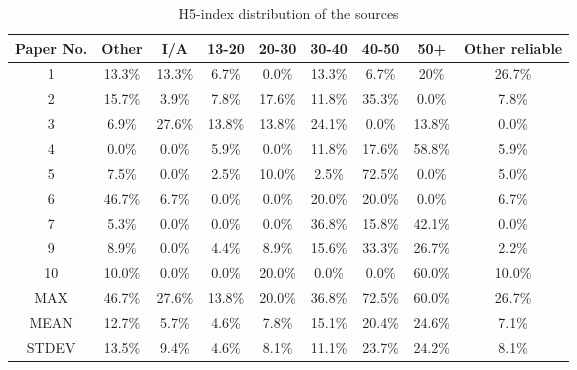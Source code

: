 \begin{table}[htb]
    \caption{H5-index distribution of the sources}
    \centering
      \begin{tabular}{ccccccccc}
        \toprule[1.5pt]
        \textbf{Paper No.} &	\textbf{Other}&	\textbf{I/A}&	\textbf{13-20}&	\textbf{20-30}&	\textbf{30-40} & \textbf{40-50} &\textbf{50+}	&\textbf{Other reliable} \\
        \midrule[1pt]
        1	&13.3\%	&13.3\%	&6.7\%&	0.0\%	&13.3\%	&6.7\%	&20\%	&26.7\% \\
        2	&15.7\%	&3.9\%	&7.8\%	&17.6\%	&11.8\%	&35.3\%	&0.0\%	&7.8\% \\
        3	&6.9\%	&27.6\%	&13.8\%	&13.8\%	&24.1\%	&0.0\%	&13.8\%	&0.0\% \\
        4	&0.0\%	&0.0\%	&5.9\%	&0.0\%	&11.8\%	&17.6\%	&58.8\%	&5.9\% \\
        5	&7.5\%	&0.0\%&	2.5\%	&10.0\%	&2.5\%&	72.5\%	&0.0\%	&5.0\%\\
        6	&46.7\%	&6.7\%&	0.0\%	&0.0\%	&20.0\%&	20.0\%	&0.0\%	&6.7\% \\
        7	&5.3\%	&0.0\%	&0.0\%	&0.0\%	&36.8\%	&15.8\%	&42.1\%	&0.0\%\\
        9	&8.9\%	&0.0\%	&4.4\%	&8.9\%	&15.6\%&	33.3\%	&26.7\%	&2.2\%\\
        10	&10.0\%	&0.0\%	&0.0\%	&20.0\%	&0.0\%&	0.0\%	&60.0\%	&10.0\%\\
        MAX	&46.7\%	&27.6\%	&13.8\%	&20.0\%	&36.8\%&	72.5\%&	60.0\%	&26.7\% \\
        MEAN	&12.7\%	&5.7\%	&4.6\%&	7.8\%&	15.1\%&	20.4\%	&24.6\%	&7.1\%\\
        STDEV	&13.5\%	&9.4\%	&4.6\%	&8.1\%	&11.1\%&	23.7\% &24.2\%	&8.1\% \\
      \bottomrule[1.5pt]
    \end{tabular}
    \label{tab:source_h5}
  \end{table}

